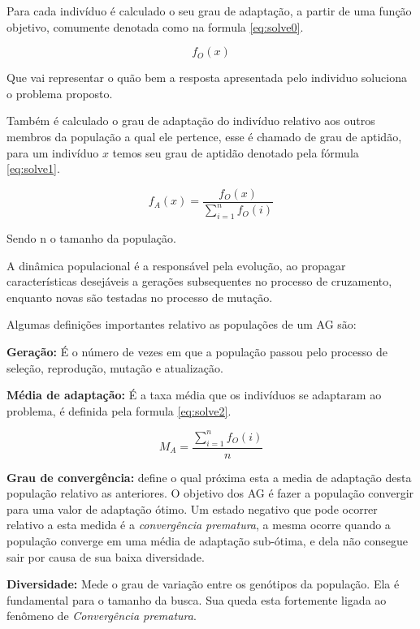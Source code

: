 Para cada indivíduo é calculado o seu grau de adaptação, a partir de uma função objetivo, comumente denotada como na formula \ref{eq:solve0}.

\begin{equation} \label{eq:solve0}
f_O(x)  
\end{equation}


Que vai representar o quão bem a resposta apresentada pelo individuo soluciona o problema proposto.

Também é calculado o grau de adaptação do indivíduo relativo aos outros membros da população a qual ele pertence, esse é chamado de grau de aptidão, para um indivíduo $x$ temos seu grau de aptidão denotado pela fórmula \ref{eq:solve1}.


\begin{equation} \label{eq:solve1}
    f_A(x) = \frac{f_O(x)}{ \sum_{i=1}^{n}  f_O(i)  }  
\end{equation}

 Sendo n o tamanho da população.
 
 A dinâmica populacional é a responsável pela evolução, ao propagar características desejáveis a gerações subsequentes no processo de cruzamento, enquanto novas são testadas no processo de mutação.
 
 Algumas definições importantes relativo as populações de um AG são:
 
 \textbf{Geração:} É o número de vezes em que a população passou pelo processo de seleção, reprodução, mutação e atualização.

\textbf{Média de adaptação:} É a taxa média que os indivíduos se adaptaram ao problema, é definida pela formula \ref{eq:solve2}. 

\begin{equation} \label{eq:solve2}
M_A = \frac{ \sum_{i=1}^{n} f_O(i) }{n}
\end{equation}

\textbf{Grau de convergência:} define o qual próxima esta a media de adaptação desta população relativo as anteriores. O objetivo dos AG é fazer a população convergir para uma valor de adaptação ótimo.
Um estado negativo que pode ocorrer relativo a esta medida é a \textit{convergência prematura}, a mesma ocorre quando a população converge em uma média de adaptação sub-ótima, e dela não consegue sair por causa de sua baixa diversidade.

\textbf{Diversidade:} Mede o grau de variação entre os genótipos da população. Ela é fundamental para o tamanho da busca.
Sua queda esta fortemente ligada ao fenômeno de \textit{Convergência prematura}.

